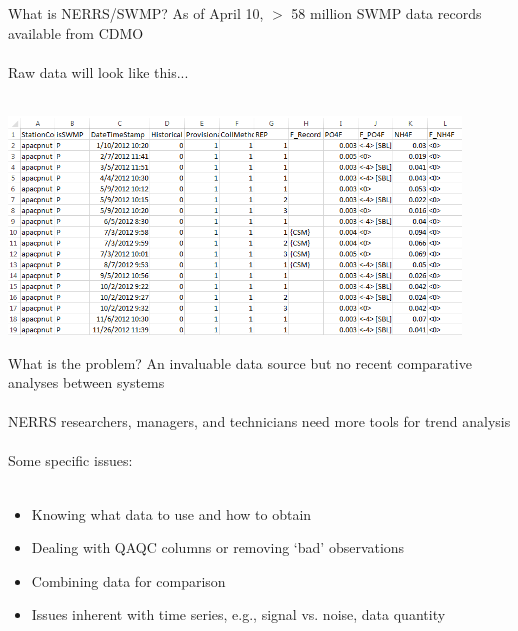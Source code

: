 \documentclass[serif]{beamer}\usepackage[]{graphicx}\usepackage[]{color}
\begin{document}
\begin{frame}[t]{What is NERRS/SWMP?}
As of April 10, $>$ 58 million SWMP data records available from CDMO\\~\\
Raw data will look like this...\\~\\
\centerline{\includegraphics[width = 0.9\textwidth]{fig/qaqc_ex.png}}
\end{frame}

\begin{frame}{What is the problem?}
An invaluable data source but no recent comparative analyses between systems \\~\\
NERRS researchers, managers, and technicians need more tools for trend analysis \\~\\
Some specific issues:\\~\\
\begin{itemize}
\item Knowing what data to use and how to obtain
\item Dealing with QAQC columns or removing `bad' observations
\item Combining data for comparison
\item Issues inherent with time series, e.g., signal vs. noise, data quantity
\end{itemize}
\end{frame}
\end{document}
